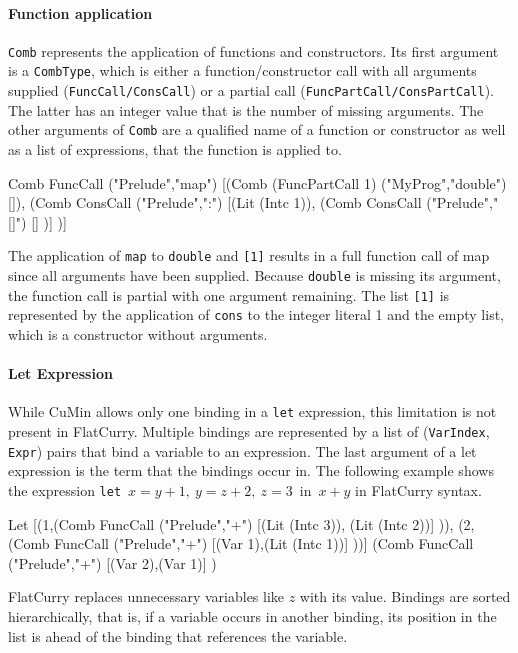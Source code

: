 \documentclass[paper = a4, fleqn, twoside]{scrreprt}
\newcommand{\coqinline}[1]{\texttt{#1}}
\begin{document}
\paragraph{Function application}
\coqinline{Comb} represents the application of functions and constructors. Its first argument is a \coqinline{CombType}, which is either a function/constructor call with all arguments supplied (\coqinline{FuncCall/ConsCall}) or a partial call (\coqinline{FuncPartCall/ConsPartCall}). The latter has an integer value that is the number of missing arguments. The other arguments of \coqinline{Comb} are a qualified name of a function or constructor as well as a list of expressions, that the function is applied to.
\begin{coqcode}
Comb FuncCall ("Prelude","map") 
     [(Comb (FuncPartCall 1) ("MyProg","double") []),
      (Comb ConsCall ("Prelude",":") [(Lit (Intc 1)),
                                      (Comb ConsCall ("Prelude","[]") [] )] )]
\end{coqcode}
The application of \texttt{map} to \texttt{double} and \texttt{[1]} results in a full function call of map since all arguments have been supplied. Because \texttt{double} is missing its argument, the function call is partial with one argument remaining. The list \texttt{[1]} is represented by the application of \texttt{cons} to the integer literal 1 and the empty list, which is a constructor without arguments.
\paragraph{Let Expression}
While CuMin allows only one binding in a \texttt{let} expression, this limitation is not present in FlatCurry. Multiple bindings are represented by a list of (\coqinline{VarIndex}, \coqinline{Expr}) pairs that bind a variable to an expression. The last argument of a let expression is the term that the bindings occur in. The following example shows the expression \mbox{\texttt{let} $x = y + 1,\: y = z + 2,\: z = 3$ in $x + y$} in FlatCurry syntax.
\begin{coqcode}
Let [(1,(Comb FuncCall ("Prelude","+") [(Lit (Intc 3)), (Lit (Intc 2))] )),
     (2,(Comb FuncCall ("Prelude","+") [(Var 1),(Lit (Intc 1))] ))]
    (Comb FuncCall ("Prelude","+") [(Var 2),(Var 1)] )
\end{coqcode}
FlatCurry replaces unnecessary variables like $z$ with its value. Bindings are sorted hierarchically, that is, if a variable occurs in another binding, its position in the list is ahead of the binding that references the variable.
\end{document}
